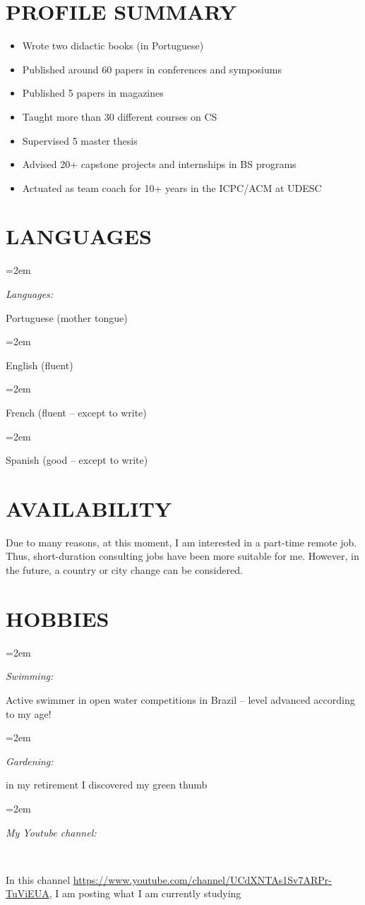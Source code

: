 \documentclass[paper=a4,fontsize=11pt]{scrartcl} %
\newlength{\spacebox}
\newcommand{\sepspace}{\vspace*{0.8em}}		%
\newcommand{\NewPart}[1]{\section*{\uppercase{#1}}}
\newcommand{\PersonalEntry}[2]{
		\noindent\hangindent=2em\hangafter=0 %
		\parbox{\spacebox}{        %
		\textit{#1}}		       %
		\hspace{1.5em} #2 \par}    %
\newcommand{\SkillsEntry}[2]{      %
		\noindent\hangindent=2em\hangafter=0 %
		\parbox{\spacebox}{        %
		\textit{#1}}			   %
		\hspace{1.5em} #2 \par}    %
\begin{document}
\NewPart{Profile Summary}{} %

\begin{itemize}
\setlength\itemsep{-2mm}
\item Wrote two didactic books  (in Portuguese)
\item Published around 60 papers in conferences and symposiums
\item Published 5 papers in magazines
\item Taught more than 30 different courses on CS 
\item Supervised 5 master thesis 
\item Advised  20+ capstone projects and internships in BS programs
\item Actuated as team coach for 10+ years in the ICPC/ACM at UDESC

\end{itemize}
\begin{comment}
\NewPart{Not my Cup of the Tea}{}

\begin{itemize}
\setlength\itemsep{-2mm}
\item Web developer
\item Front-end developer
\item Data-bank expert

\end{itemize}
\end{comment}

\NewPart{Languages}{}

\SkillsEntry{Languages:} {Portuguese (mother tongue)}
\SkillsEntry{}{English (fluent)}
\SkillsEntry{}{French (fluent -- except to write)}
\SkillsEntry{}{Spanish (good -- except to write)}


\NewPart{Availability}{}

Due to many reasons, at this moment, I am interested in a part-time remote job. Thus,  short-duration consulting jobs  have been more suitable for me. However, in the future, a country or city change can be considered.

\NewPart{Hobbies}{}

\SkillsEntry{Swimming:}{Active swimmer in open water competitions in Brazil -- level advanced according to my age!}
\sepspace

\SkillsEntry{Gardening:}{in my retirement I discovered my green thumb}
\sepspace

\SkillsEntry{My Youtube channel:} \\
{In this channel \url{https://www.youtube.com/channel/UCdXNTAs1Sv7ARPr-TuViEUA},
 I am posting what I am currently studying}
\end{document}
